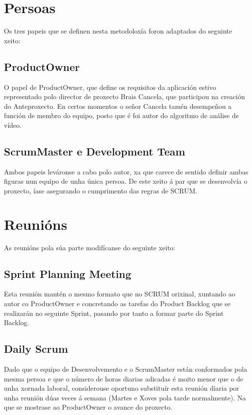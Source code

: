 \section{Persoas}

    Os tres papeis que se definen nesta metodoloxía \cite{la-guia-de-scrum} foron 
    adaptados do seguinte xeito:

    \subsection{ProductOwner}
        O papel de ProductOwner, que define os requisitos da aplicación estivo representado 
        polo director de proxecto Brais Cancela, que participou na creación do Anteproxecto.
        En certos momentos o señor Cancela tamén desempeñou a función de membro do equipo, 
        posto que é foi autor do algoritmo de análise de vídeo. 

    \subsection{ScrumMaster e Development Team}
        Ambos papeis leváronse a cabo polo autor, xa que carece de sentido definir ambas figuras
        nun equipo de unha única persoa. De este xeito á par que se desenvolvía o proxecto, íase
        asegurando o cumprimento das regras de SCRUM.
    
\section{Reunións}
As reunións pola súa parte modifícanse do seguinte xeito:

    \subsection{Sprint Planning Meeting}
        Esta reunión mantén o mesmo formato que no SCRUM orixinal, xuntando ao autor co	ProductOwner 
        e concretando as tarefas do Product Backlog que se realizarán no seguinte Sprint, pasando
        por tanto a formar parte do Sprint Backlog.
    
    \subsection{Daily Scrum}
        Dado que o equipo de Desenvolvemento e o ScrumMaster están conformados pola mesma persoa
        e que o número de horas diarias adicadas é moito menor que o de unha xornada laboral, considerouse
        oportuno substituír esta reunión diaria por unha reunión dúas veces á semana (Martes e Xoves 
        pola tarde normalmente). Na que se mostrase ao ProductOwner o avance do proxecto.
    
